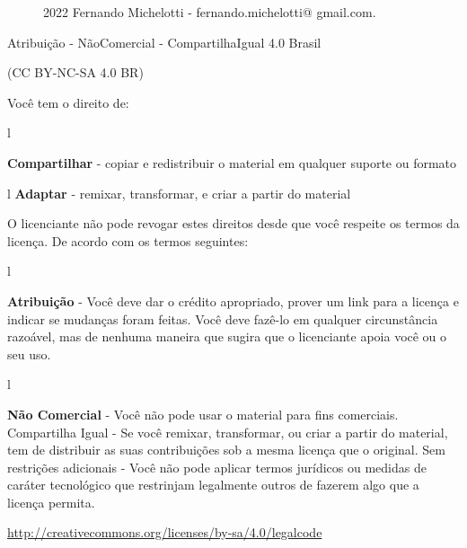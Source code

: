 \setmainfont{Liberation Sans}

\begin{figure}
 

 \caption{2022 Fernando Michelotti - fernando.michelotti@ gmail.com.}
\end{figure}


Atribuição - NãoComercial - CompartilhaIgual 4.0 Brasil

(CC BY-NC-SA 4.0 BR)

Você tem o direito de:


\begin{wrapfigure}{l}{\textwidth}

\textbf{Compartilhar} - copiar e redistribuir o material em qualquer suporte ou formato
\end{wrapfigure}

\begin{wrapfigure}{l}{\textwidth}
\textbf{Adaptar} - remixar, transformar, e criar a partir do material

O licenciante não pode revogar estes direitos desde que você respeite os termos da licença.
De acordo com os termos seguintes:
\end{wrapfigure}

\begin{wrapfigure}{l}{\textwidth}

\textbf{Atribuição} - Você deve dar o crédito apropriado, prover um link para a licença
e indicar se mudanças foram feitas. Você deve fazê-lo em qualquer circunstância
razoável, mas de nenhuma maneira que sugira que o licenciante apoia você ou
o seu uso.
\end{wrapfigure}

\begin{wrapfigure}{l}{\textwidth}

\textbf{Não Comercial} - Você não pode usar o material para fins comerciais.
Compartilha Igual - Se você remixar, transformar, ou criar a partir do material,
tem de distribuir as suas contribuições sob a mesma licença que o original.
Sem restrições adicionais - Você não pode aplicar termos jurídicos ou medidas de caráter
tecnológico que restrinjam legalmente outros de fazerem algo que a licença permita.
\end{wrapfigure}


\url{http://creativecommons.org/licenses/by-sa/4.0/legalcode}


\clearpage
\newpage 

